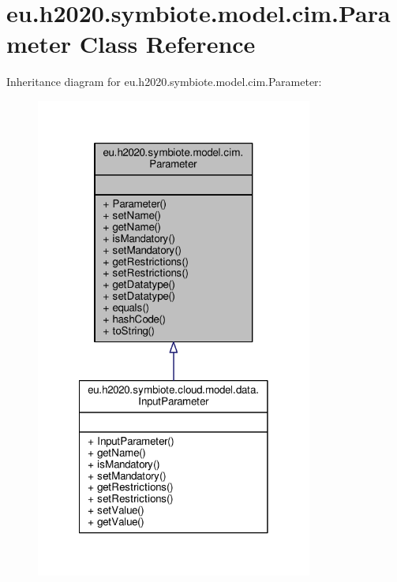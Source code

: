 \hypertarget{classeu_1_1h2020_1_1symbiote_1_1model_1_1cim_1_1Parameter}{}\section{eu.\+h2020.\+symbiote.\+model.\+cim.\+Parameter Class Reference}
\label{classeu_1_1h2020_1_1symbiote_1_1model_1_1cim_1_1Parameter}


Inheritance diagram for eu.\+h2020.\+symbiote.\+model.\+cim.\+Parameter\+:\nopagebreak
\begin{figure}[H]
\begin{center}
\leavevmode
\includegraphics[width=258pt]{classeu_1_1h2020_1_1symbiote_1_1model_1_1cim_1_1Parameter__inherit__graph}
\end{center}
\end{figure}


